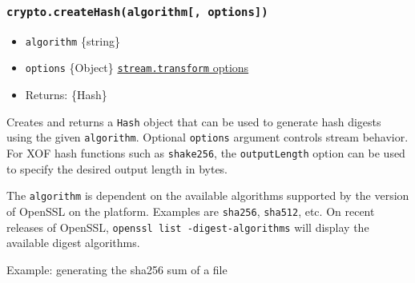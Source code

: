 \subsubsection{\texorpdfstring{\texttt{crypto.createHash(algorithm{[},\ options{]})}}{crypto.createHash(algorithm{[}, options{]})}}\label{crypto.createhashalgorithm-options}

\begin{itemize}
\tightlist
\item
  \texttt{algorithm} \{string\}
\item
  \texttt{options} \{Object\}
  \href{stream.md\#new-streamtransformoptions}{\texttt{stream.transform}
  options}
\item
  Returns: \{Hash\}
\end{itemize}

Creates and returns a \texttt{Hash} object that can be used to generate
hash digests using the given \texttt{algorithm}. Optional
\texttt{options} argument controls stream behavior. For XOF hash
functions such as \texttt{\textquotesingle{}shake256\textquotesingle{}},
the \texttt{outputLength} option can be used to specify the desired
output length in bytes.

The \texttt{algorithm} is dependent on the available algorithms
supported by the version of OpenSSL on the platform. Examples are
\texttt{\textquotesingle{}sha256\textquotesingle{}},
\texttt{\textquotesingle{}sha512\textquotesingle{}}, etc. On recent
releases of OpenSSL, \texttt{openssl\ list\ -digest-algorithms} will
display the available digest algorithms.

Example: generating the sha256 sum of a file

